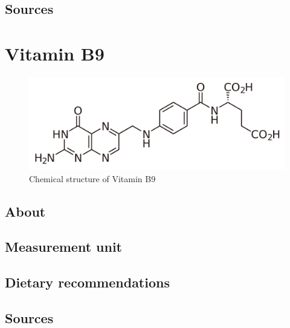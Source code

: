 \documentclass{book}
\begin{document}
\section{Sources}


\chapter{Vitamin B9}
\begin{figure}[h]
	\centering \includegraphics[width=0.75\linewidth]{images/Vitamin_B9_chemical_structure}
	\caption{Chemical structure of Vitamin B9}
\end{figure}

\section{About}


\section{Measurement unit}


\section{Dietary recommendations}


\section{Sources}
\end{document}
